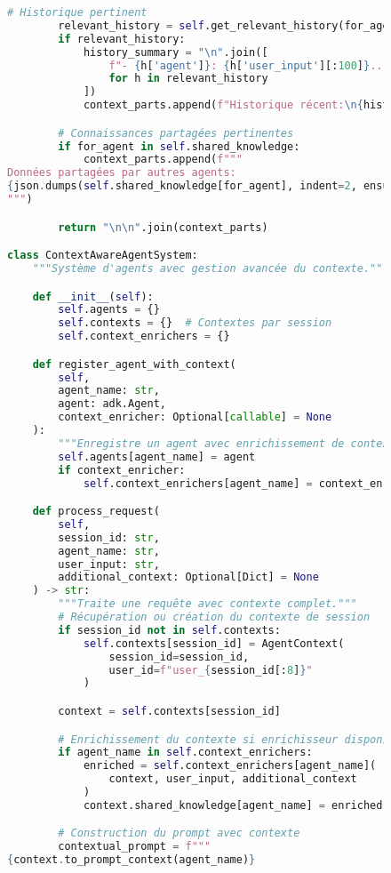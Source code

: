 \begin{figure}[H]
\begin{lstlisting}[language=Python, caption=Système de gestion du contexte inter-agents]
        # Historique pertinent
        relevant_history = self.get_relevant_history(for_agent)
        if relevant_history:
            history_summary = "\n".join([
                f"- {h['agent']}: {h['user_input'][:100]}..."
                for h in relevant_history
            ])
            context_parts.append(f"Historique récent:\n{history_summary}")

        # Connaissances partagées pertinentes
        if for_agent in self.shared_knowledge:
            context_parts.append(f"""
Données partagées par autres agents:
{json.dumps(self.shared_knowledge[for_agent], indent=2, ensure_ascii=False)}
""")

        return "\n\n".join(context_parts)

class ContextAwareAgentSystem:
    """Système d'agents avec gestion avancée du contexte."""

    def __init__(self):
        self.agents = {}
        self.contexts = {}  # Contextes par session
        self.context_enrichers = {}

    def register_agent_with_context(
        self,
        agent_name: str,
        agent: adk.Agent,
        context_enricher: Optional[callable] = None
    ):
        """Enregistre un agent avec enrichissement de contexte optionnel."""
        self.agents[agent_name] = agent
        if context_enricher:
            self.context_enrichers[agent_name] = context_enricher

    def process_request(
        self,
        session_id: str,
        agent_name: str,
        user_input: str,
        additional_context: Optional[Dict] = None
    ) -> str:
        """Traite une requête avec contexte complet."""
        # Récupération ou création du contexte de session
        if session_id not in self.contexts:
            self.contexts[session_id] = AgentContext(
                session_id=session_id,
                user_id=f"user_{session_id[:8]}"
            )

        context = self.contexts[session_id]

        # Enrichissement du contexte si enrichisseur disponible
        if agent_name in self.context_enrichers:
            enriched = self.context_enrichers[agent_name](
                context, user_input, additional_context
            )
            context.shared_knowledge[agent_name] = enriched

        # Construction du prompt avec contexte
        contextual_prompt = f"""
{context.to_prompt_context(agent_name)}


\end{lstlisting}
\end{figure}
